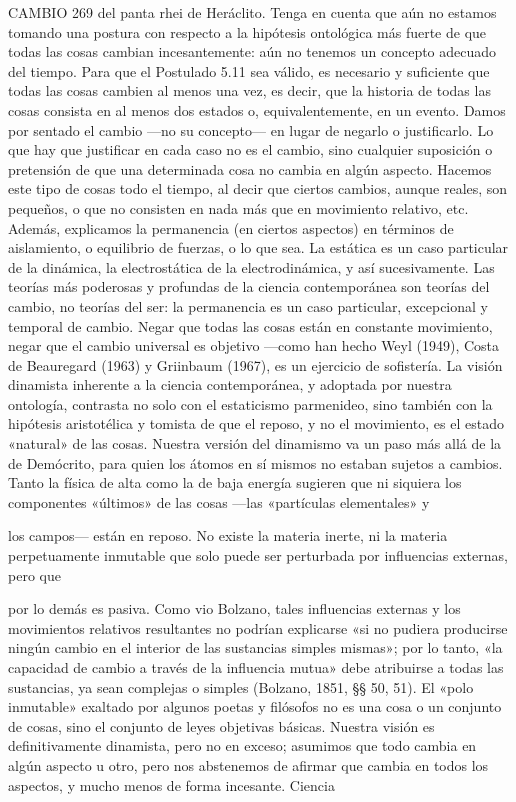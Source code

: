 \begin{justifying}
\begin{justifying}
CAMBIO 269
del panta rhei de Heráclito. Tenga en cuenta que aún no estamos tomando una postura
con respecto a la hipótesis ontológica más fuerte de que todas las cosas cambian
incesantemente: aún no tenemos un concepto adecuado del tiempo. Para que el Postulado
5.11 sea válido, es necesario y suficiente que todas las cosas cambien al menos
una vez, es decir, que la historia de todas las cosas consista en al menos dos estados o,
equivalentemente, en un evento.
Damos por sentado el cambio —no su concepto— en lugar de negarlo
o justificarlo. Lo que hay que justificar en cada caso no es el cambio, sino
cualquier suposición o pretensión de que una determinada cosa no
cambia en algún aspecto. Hacemos este tipo de cosas todo el tiempo, al decir
que ciertos cambios, aunque reales, son pequeños, o que no consisten en
nada más que en movimiento relativo, etc. Además, explicamos la permanencia (en
ciertos aspectos) en términos de aislamiento, o equilibrio de
fuerzas, o lo que sea. La estática es un caso particular de la dinámica, la electrostática
de la electrodinámica, y así sucesivamente. Las teorías más poderosas y profundas de la
ciencia contemporánea son teorías del cambio, no teorías del ser:
la permanencia es un caso particular, excepcional y temporal de cambio. Negar
que todas las cosas están en constante movimiento, negar que el cambio universal es
objetivo —como han hecho Weyl (1949), Costa de Beauregard (1963) y Griinbaum
(1967), es un ejercicio de sofistería.
La visión dinamista inherente a la ciencia contemporánea, y adoptada
por nuestra ontología, contrasta no solo con el estaticismo parmenideo, sino también
con la hipótesis aristotélica y tomista de que el reposo, y no
el movimiento, es el estado «natural» de las cosas. Nuestra versión del dinamismo va
un paso más allá de la de Demócrito, para quien los átomos en sí mismos
no estaban sujetos a cambios. Tanto la física de alta como la de baja energía sugieren que ni
siquiera los componentes «últimos» de las cosas —las «partículas elementales» y

los campos— están en reposo. No existe la materia inerte, ni la materia perpetuamente inmutable
que solo puede ser perturbada por influencias externas, pero que

por lo demás es pasiva. Como vio Bolzano, tales influencias externas y los
movimientos relativos resultantes no podrían explicarse «si no pudiera
 producirse ningún cambio en el interior de las sustancias simples mismas»; por lo tanto,
«la capacidad de cambio a través de la influencia mutua» debe atribuirse
a todas las sustancias, ya sean complejas o simples (Bolzano, 1851, §§ 50, 51).
El «polo inmutable» exaltado por algunos poetas y filósofos no es una
cosa o un conjunto de cosas, sino el conjunto de leyes objetivas básicas.
Nuestra visión es definitivamente dinamista, pero no en exceso; asumimos
que todo cambia en algún aspecto u otro, pero nos abstenemos de
afirmar que cambia en todos los aspectos, y mucho menos de forma incesante. Ciencia
   \noindent


\end{justifying}
\end{justifying}
